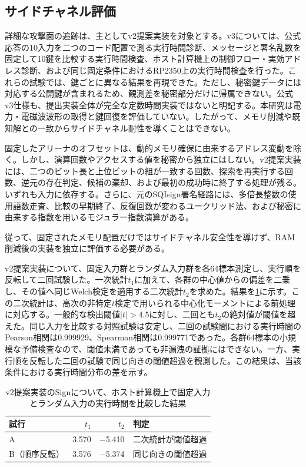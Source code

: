 \documentclass[a4paper,10pt]{ltjsarticle}
\theoremstyle{definition}
\theoremstyle{remark}
\begin{document}
\subsection{サイドチャネル評価}
\label{sec:sca}

詳細な攻撃面の追跡は、主としてv2提案実装を対象とする。v3については、公式応答の10入力を二つのコード配置で測る実行時間診断、メッセージと署名乱数を固定して10鍵を比較する実行時間検査、ホスト計算機上の制御フロー・実効アドレス診断、および同じ固定条件におけるRP2350上の実行時間検査を行った。これらの試験では、鍵ごとに異なる結果を再現できた。ただし、秘密鍵データには対応する公開鍵が含まれるため、観測差を秘密部分だけに帰属できない。公式v3仕様も、提出実装全体が完全な定数時間実装ではないと明記する\cite{sqisign-spec-v3}。本研究は電力・電磁波波形の取得と鍵回復を評価していない。したがって、メモリ削減や既知解との一致からサイドチャネル耐性を導くことはできない。

固定したアリーナのオフセットは、動的メモリ確保に由来するアドレス変動を除く。しかし、演算回数やアクセスする値を秘密から独立にはしない。v2提案実装には、二つのビット長と上位ビットの組が一致する回数、探索を再実行する回数、逆元の存在判定、候補の棄却、および最初の成功時に終了する処理が残る。いずれも入力に依存する。さらに、元のSQIsign署名経路には、多倍長整数の使用語数走査、比較の早期終了、反復回数が変わるユークリッド法、および秘密に由来する指数を用いるモジュラー指数演算がある。

従って、固定されたメモリ配置だけではサイドチャネル安全性を導けず、RAM削減後の実装を独立に評価する必要がある。

v2提案実装について、固定入力群とランダム入力群を各64標本測定し、実行順を反転して二回試験した。一次統計$t_1$に加えて、各群の中心値からの偏差を二乗し、その値へ同じWelch検定を適用する二次統計$t_2$を求めた。結果を\cref{tab:timing-test}に示す。この二次統計は、高次の非特定$t$検定で用いられる中心化モーメントによる前処理に対応する\cite{schneider-moradi-2016}。一般的な検出閾値$|t|>4.5$\cite{schneider-moradi-2016}に対し、二回とも$t_2$の絶対値が閾値を超えた。同じ入力を比較する対照試験は安定し、二回の試験間における実行時間のPearson相関は\num{0.999929}、Spearman相関は\num{0.999771}であった。各群64標本の小規模な予備検査なので、閾値未満であっても非漏洩の証拠にはできない。一方、実行順を反転した二回の試験で同じ向きの閾値超過を観測した。この結果は、当該条件における実行時間分布の差を示す。

\begin{table}[H]
  \centering
  \caption{v2提案実装のSignについて、ホスト計算機上で固定入力とランダム入力の実行時間を比較した結果}
  \label{tab:timing-test}
  \small
  \begin{tabular}{@{}lrrl@{}}
    \toprule
    試行 & $t_1$ & $t_2$ & 判定 \\
    \midrule
    A & \num{3.570} & \num{-5.410} & 二次統計が閾値超過 \\
    B（順序反転） & \num{3.576} & \num{-5.374} & 同じ向きの閾値超過 \\
    \bottomrule
  \end{tabular}
\end{table}
\end{document}
